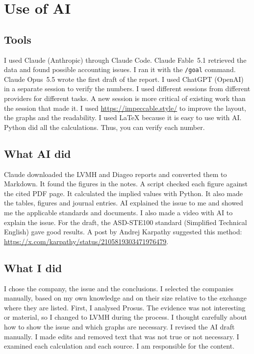 \section*{Use of AI}

\subsection*{Tools}
I used Claude (Anthropic) through Claude Code.
Claude Fable~5.1 retrieved the data and found possible accounting issues. I ran it with the \texttt{/goal} command.
Claude Opus~5.5 wrote the first draft of the report.
I used ChatGPT (OpenAI) in a separate session to verify the numbers.
I used different sessions from different providers for different tasks. A new session is more critical of existing work than the session that made it.
I used \url{https://impeccable.style/} to improve the layout, the graphs and the readability.
I used \LaTeX{} because it is easy to use with AI.
Python did all the calculations. Thus, you can verify each number.

\subsection*{What AI did}
Claude downloaded the LVMH and Diageo reports and converted them to Markdown.
It found the figures in the notes. A script checked each figure against the cited PDF page.
It calculated the implied values with Python. It also made the tables, figures and journal entries.
AI explained the issue to me and showed me the applicable standards and documents.
I also made a video with AI to explain the issue.
For the draft, the ASD-STE100 standard (Simplified Technical English) gave good results. A post by Andrej Karpathy suggested this method: \url{https://x.com/karpathy/status/2105819303471976479}.

\subsection*{What I did}
I chose the company, the issue and the conclusions.
I selected the companies manually, based on my own knowledge and on their size relative to the exchange where they are listed.
First, I analysed Prosus. The evidence was not interesting or material, so I changed to LVMH during the process.
I thought carefully about how to show the issue and which graphs are necessary.
I revised the AI draft manually. I made edits and removed text that was not true or not necessary.
I examined each calculation and each source. I am responsible for the content.

